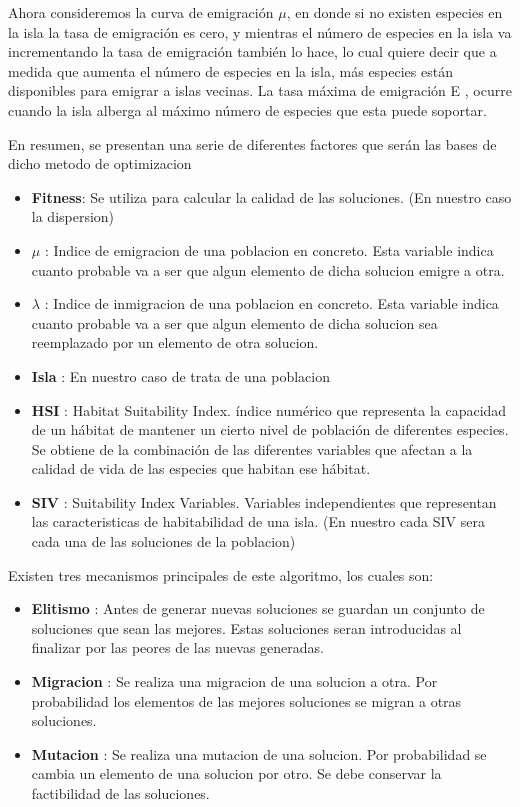 \documentclass{article}
\begin{document}
\vspace {3mm}
Ahora consideremos la curva de emigración $\mu$, en donde si no existen
especies en la isla la tasa de emigración es cero, y mientras el número de
especies en la isla va incrementando la tasa de emigración también lo hace,
lo cual quiere decir que a medida que aumenta el número de especies en la
isla, más especies están disponibles para emigrar a islas vecinas. La tasa
máxima de emigración E , ocurre cuando la isla alberga al máximo número
de especies que esta puede soportar.


En resumen, se presentan una serie de diferentes factores que serán las bases de dicho metodo de optimizacion
\begin{itemize}
	\item \textbf{Fitness}: Se utiliza para calcular la calidad de las soluciones. (En nuestro caso la dispersion)
	\item \textbf{$\mu$} : Indice de emigracion de una poblacion en concreto. Esta variable indica cuanto probable va a ser que algun elemento de dicha solucion
	      emigre a otra.
	\item \textbf{$\lambda$} : Indice de inmigracion de una poblacion en concreto. Esta variable indica cuanto probable va a ser que algun elemento de dicha solucion
	      sea reemplazado por un elemento de otra solucion.
  \item \textbf{Isla} : En nuestro caso de trata de una poblacion
	\item \textbf{HSI} : Habitat Suitability Index. índice numérico que representa la
  capacidad de un hábitat de mantener un cierto nivel de población de
  diferentes especies. Se obtiene de la combinación de las diferentes
  variables que afectan a la calidad de vida de las especies que habitan ese
  hábitat.
	\item \textbf{SIV} : Suitability Index Variables. Variables independientes que representan las caracteristicas de habitabilidad de una isla. (En nuestro cada SIV sera cada 
  una de las soluciones de la poblacion)
\end{itemize}

Existen tres mecanismos principales de este algoritmo, los cuales son:
\begin{itemize}
  \item \textbf{Elitismo} : Antes de generar nuevas soluciones se guardan un conjunto de soluciones que sean las mejores.
  Estas soluciones seran introducidas al finalizar por las peores de las nuevas generadas.
  \item \textbf{Migracion} : Se realiza una migracion de una solucion a otra. Por probabilidad los elementos de las mejores soluciones se migran a otras soluciones.
  \item \textbf{Mutacion} : Se realiza una mutacion de una solucion. Por probabilidad se cambia un elemento de una solucion por otro. Se debe conservar la factibilidad
  de las soluciones.
\end{itemize}
\end{document}
